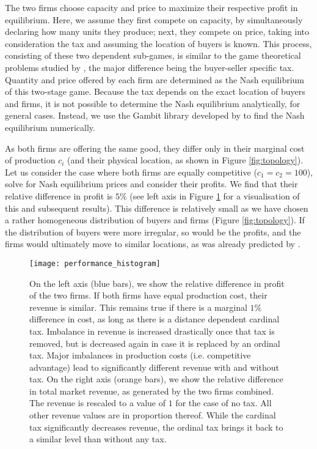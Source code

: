 \documentclass[final,5p,times,twocolumn,11pt,authoryear]{elsarticle}
\numberwithin{equation}{section} %
\begin{document}
The two firms choose capacity and price to maximize their respective profit in equilibrium. 
Here, we assume they first compete on capacity, by simultaneously declaring how many units they produce;
next, they compete on price, taking into consideration the tax and assuming the location of buyers is known. 
This process, consisting of these two dependent sub-games, is similar to the game theoretical problems studied by \cite{Kreps1983}, the major difference being the buyer-seller specific tax.
Quantity and price offered by each firm are determined as the Nash equilibrium of this two-stage game. 
Because the tax depends on the exact location of buyers and firms, 
it is not possible to determine the Nash equilibrium analytically, for general cases. 
Instead, we use the Gambit library developed by \cite{McKelvey2016} to find the Nash equilibrium numerically. 

As both firms are offering the same good, they differ only in their marginal cost of production $c_i$ (and their physical location, as shown in Figure \ref{fig:topology}). 
Let us consider the case where both firms are equally competitive ($c_1 = c_2 = 100$), solve for Nash equilibrium prices and consider their profits. 
We find that their relative difference in profit is $5\%$ (see left axis in Figure \ref{fig:results} for a visualisation of this and subsequent results).
This difference is relatively small as we have chosen a rather homogeneous distribution of buyers and firms (Figure \ref{fig:topology}).
If the distribution of buyers were more irregular, so would be the profits, and the firms would ultimately move to similar locations, as was already predicted by \cite{Hotelling1929}.

\begin{figure}[!htb]
	\centering
	\texttt{[image: performance\_histogram]}
	\caption{	On the left axis (blue bars), we show the relative difference in profit of the two firms.
			If both firms have equal production cost, their revenue is similar. 
			This remains true if there is a marginal $1\%$ difference in cost, as long as there is a distance dependent cardinal tax. 
			Imbalance in revenue is increased drastically once that tax is removed, but is decreased again in case it is replaced by an ordinal tax. 
			Major imbalances in production costs (i.e. competitive advantage) lead to significantly different revenue with and without tax. 
			On the right axis (orange bars), we show the relative difference in total market revenue, as generated by the two firms combined. 
			The revenue is rescaled to a value of $1$ for the case of no tax. 
			All other revenue values are in proportion thereof. 
			While the cardinal tax significantly decreases revenue, the ordinal tax brings it back to a similar level than without any tax. 
			}
	\label{fig:results}
\end{figure}
\end{document}
